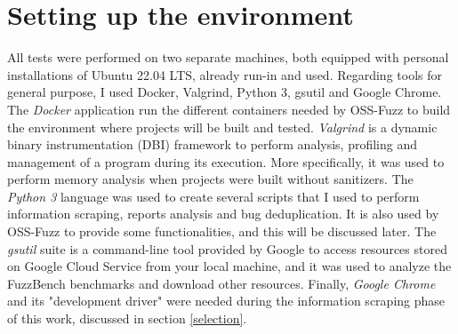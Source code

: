 \newpage
\section{Setting up the environment}

 

All tests were performed on two separate machines, both equipped with personal installations of Ubuntu 22.04 LTS, already run-in and used.
\newline \newline \newline
Regarding tools for general purpose, I used Docker, Valgrind, Python 3, gsutil and Google Chrome.
\newline \newline
The \textit{Docker} \cite{Docker} application run the different containers needed by OSS-Fuzz to build the environment where projects will be built and tested.
\newline \newline
\textit{Valgrind} \cite{Valgrind_1}\cite{Valgrind_2} is a dynamic binary instrumentation (DBI) framework to perform analysis, profiling and management of a program during its execution.
More specifically, it was used to perform memory analysis when projects were built without sanitizers.
\newline \newline
The \textit{Python 3} language was used to create several scripts that I used to perform information scraping, reports analysis and bug deduplication.
It is also used by OSS-Fuzz to provide some functionalities, and this will be discussed later. 
\newline \newline
The \textit{gsutil} suite is a command-line tool provided by Google to access resources stored on Google Cloud Service from your local machine, and it was used to analyze the FuzzBench benchmarks and download other resources.
\newline \newline
Finally, \textit{Google Chrome} and its "development driver" were needed during the information scraping phase of this work, discussed in section \ref{selection}.
\newline \newline \newline
